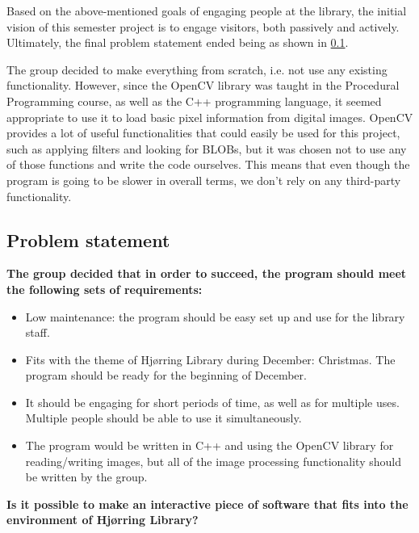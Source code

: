 Based on the above-mentioned goals of engaging people at the library, the initial vision of this semester project is to engage visitors, both passively and actively. Ultimately, the final problem statement ended being as shown in \ref{problemStatement}.

The group decided to make everything from scratch, i.e. not use any existing functionality. However, since the OpenCV library was taught in the Procedural Programming course, as well as the C++ programming language, it seemed appropriate to use it to load basic pixel information from digital images. OpenCV provides a lot of useful functionalities that could easily be used for this project, such as applying filters and looking for BLOBs, but it was chosen not to use any of those functions and write the code ourselves. This means that even though the program is going to be slower in overall terms, we don't rely on any third-party functionality.

\subsection{Problem statement}\label{problemStatement}
\textbf{The group decided that in order to succeed, the program should meet the following sets of requirements:}

\begin{itemize}
\item Low maintenance: the program should be easy set up and use for the library staff.
\item Fits with the theme of Hj{\o}rring Library during December: Christmas. The program should be ready for the beginning of December.
\item It should be engaging for short periods of time, as well as for multiple uses. Multiple people should be able to use it simultaneously.
\item The program would be written in C++ and using the OpenCV library for reading/writing images, but all of the image processing functionality should be written by the group.
\end{itemize}

\textbf{Is it possible to make an interactive piece of software that fits into the environment of Hj{\o}rring Library?}